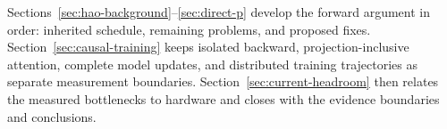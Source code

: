 Sections~\ref{sec:hao-background}--\ref{sec:direct-p} develop the forward
argument in order: inherited schedule, remaining problems, and proposed
fixes.  Section~\ref{sec:causal-training} keeps isolated backward,
projection-inclusive attention, complete model updates, and distributed
training trajectories as separate measurement boundaries.
Section~\ref{sec:current-headroom} then relates the measured bottlenecks to
hardware and closes with the evidence boundaries and conclusions.
